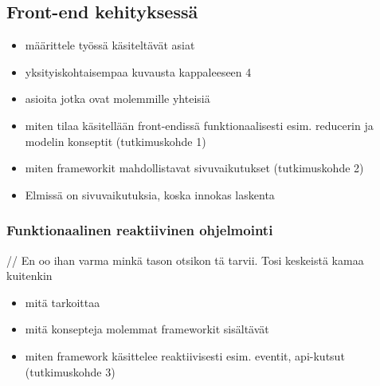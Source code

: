 \subsection{Front-end kehityksessä}

\begin{itemize}
  \item määrittele työssä käsiteltävät asiat
  \item yksityiskohtaisempaa kuvausta kappaleeseen 4
  \item asioita jotka ovat molemmille yhteisiä
  \item miten tilaa käsitellään front-endissä funktionaalisesti esim. reducerin ja modelin konseptit (tutkimuskohde 1)
  \item miten frameworkit mahdollistavat sivuvaikutukset (tutkimuskohde 2)
  \item Elmissä on sivuvaikutuksia, koska innokas laskenta
\end{itemize}

\subsubsection{Funktionaalinen reaktiivinen ohjelmointi}

// En oo ihan varma minkä tason otsikon tä tarvii. Tosi keskeistä kamaa kuitenkin

\begin{itemize}
  \item mitä tarkoittaa
  \item mitä konsepteja molemmat frameworkit sisältävät
  \item miten framework käsittelee reaktiivisesti esim. eventit, api-kutsut (tutkimuskohde 3)
\end{itemize}

